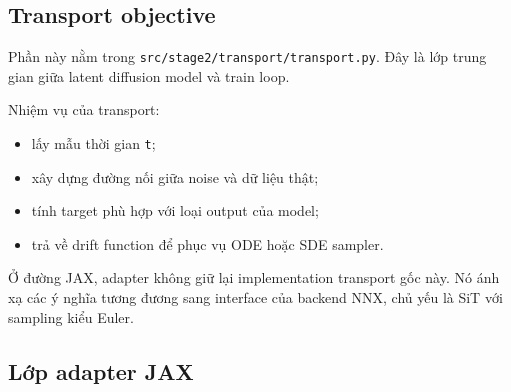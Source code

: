 \subsection{Transport objective}

Phần này nằm trong \texttt{src/stage2/transport/transport.py}. Đây là lớp trung
gian giữa latent diffusion model và train loop.

Nhiệm vụ của transport:

\begin{itemize}[leftmargin=1.5em]
  \item lấy mẫu thời gian \texttt{t};
  \item xây dựng đường nối giữa noise và dữ liệu thật;
  \item tính target phù hợp với loại output của model;
  \item trả về drift function để phục vụ ODE hoặc SDE sampler.
\end{itemize}

Ở đường JAX, adapter không giữ lại implementation transport gốc này. Nó ánh xạ
các ý nghĩa tương đương sang interface của backend NNX, chủ yếu là SiT với
sampling kiểu Euler.

\subsection{Lớp adapter JAX}

